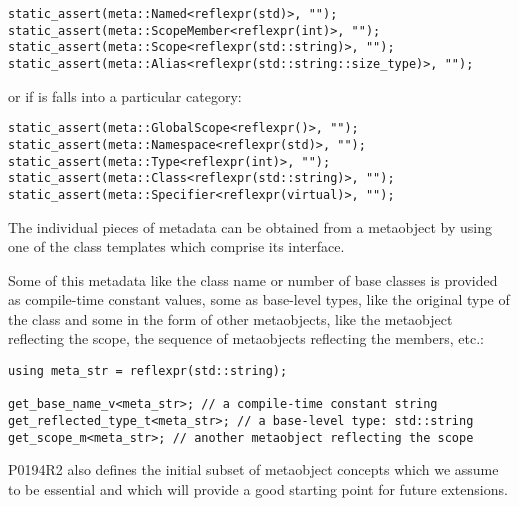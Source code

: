 \begin{verbatim}
static_assert(meta::Named<reflexpr(std)>, "");
static_assert(meta::ScopeMember<reflexpr(int)>, "");
static_assert(meta::Scope<reflexpr(std::string)>, "");
static_assert(meta::Alias<reflexpr(std::string::size_type)>, "");
\end{verbatim}

or if is falls into a particular category:

\begin{verbatim}
static_assert(meta::GlobalScope<reflexpr()>, "");
static_assert(meta::Namespace<reflexpr(std)>, "");
static_assert(meta::Type<reflexpr(int)>, "");
static_assert(meta::Class<reflexpr(std::string)>, "");
static_assert(meta::Specifier<reflexpr(virtual)>, "");
\end{verbatim}

The individual pieces of metadata can be obtained from a metaobject by using one
of the class templates which comprise its interface.

Some of this metadata like the class name or number of base classes is provided
as compile-time constant values, some as base-level types, like the original
type of the class and some in the form of other metaobjects, like the metaobject
reflecting the scope, the sequence of metaobjects reflecting the members, etc.:

\begin{verbatim}
using meta_str = reflexpr(std::string);

get_base_name_v<meta_str>; // a compile-time constant string
get_reflected_type_t<meta_str>; // a base-level type: std::string
get_scope_m<meta_str>; // another metaobject reflecting the scope
\end{verbatim}

P0194R2 also defines the initial subset
of metaobject concepts which we assume to be essential
and which will provide a good starting point for future extensions.

